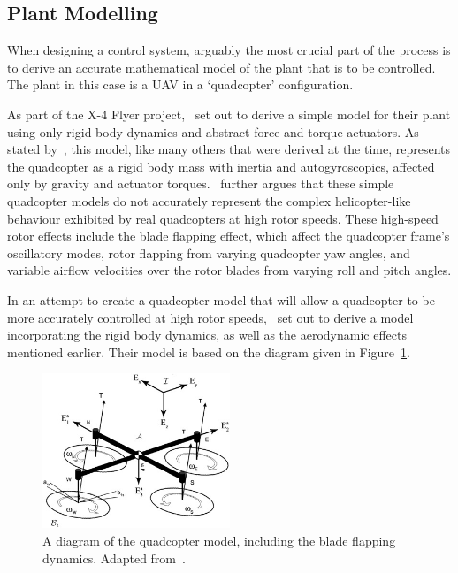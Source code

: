 \subsection{Plant Modelling}

When designing a control system, arguably the most crucial part of the process is to derive an accurate mathematical model of the plant that is to be controlled. The plant in this case is a UAV in a `quadcopter' configuration. 

As part of the X-4 Flyer project,~\cite{hamel2002dynamic} set out to derive a simple model for their plant using only rigid body dynamics and abstract force and torque actuators. As stated by~\cite{Pounds2010c}, this model, like many others that were derived at the time, represents the quadcopter as a rigid body mass with inertia and autogyroscopics, affected only by gravity and actuator torques.~\citeauthor{Pounds2010c} further argues that these simple quadcopter models do not accurately represent the complex helicopter-like behaviour exhibited by real quadcopters at high rotor speeds. These high-speed rotor effects include the blade flapping effect, which affect the quadcopter frame's oscillatory modes, rotor flapping from varying quadcopter yaw angles, and variable airflow velocities over the rotor blades from varying roll and pitch angles.

In an attempt to create a quadcopter model that will allow a quadcopter to be more accurately controlled at high rotor speeds,~\citeauthor{Pounds2010c} set out to derive a model incorporating the rigid body dynamics, as well as the aerodynamic effects mentioned earlier. Their model is based on the diagram given in Figure~\ref{fig:chap2-quad-model}.

\begin{figure}
  \centering
  \includegraphics[width=0.5\textwidth]{figures/chapter2/pounds_quad-model.jpg}
  \caption[A diagram of the quadcopter model, including the blade flapping dynamics.]{A diagram of the quadcopter model, including the blade flapping dynamics. Adapted from~\cite{Pounds2010c}.}
\label{fig:chap2-quad-model}
\end{figure}

